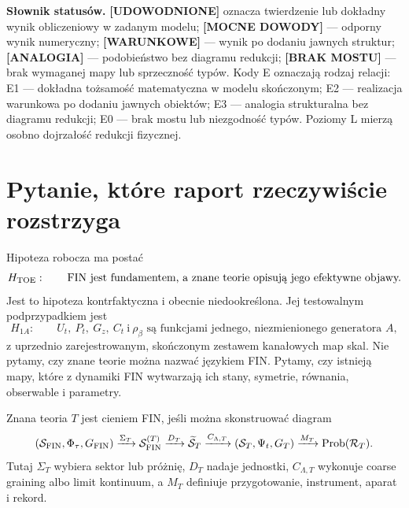 \documentclass[11pt,a4paper]{article}
\newcommand{\proven}{\textcolor{green!45!black}{\textbf{[UDOWODNIONE]}}}
\newcommand{\strong}{\textcolor{blue!70!black}{\textbf{[MOCNE DOWODY]}}}
\newcommand{\conditional}{\textcolor{black!60}{\textbf{[WARUNKOWE]}}}
\newcommand{\analogy}{\textcolor{orange!85!black}{\textbf{[ANALOGIA]}}}
\newcommand{\absent}{\textcolor{red!72!black}{\textbf{[BRAK MOSTU]}}}
\begin{document}
\begin{abstract}
Najbardziej falsyfikowalną wersją hipotezy jest węższy ansatz $H_{1A}$: wybrane kanały są funkcjami jednego zamrożonego $A$. Jeżeli niezależnie zrekonstruowane częstości, szybkości relaksacji, bieguny odpowiedzi i wagi termiczne nie mają wspólnej dopuszczalnej klasy generatora, upada $H_{1A}$, nie ogólne i niedookreślone $H_{\rm TOE}$. Najmniejsza kandydacka TOE musi rozszerzyć pojedynczy operator do operacyjnego systemu spektralnego zawierającego algebrę obserwabli, stan, sektory, jednostki, refinację, instrumenty, środowisko i rekord.
\end{abstract}

\textbf{Słownik statusów.} \proven{} oznacza twierdzenie lub dokładny wynik obliczeniowy w zadanym modelu; \strong{} --- odporny wynik numeryczny; \conditional{} --- wynik po dodaniu jawnych struktur; \analogy{} --- podobieństwo bez diagramu redukcji; \absent{} --- brak wymaganej mapy lub sprzeczność typów. Kody E oznaczają rodzaj relacji: E1 --- dokładna tożsamość matematyczna w modelu skończonym; E2 --- realizacja warunkowa po dodaniu jawnych obiektów; E3 --- analogia strukturalna bez diagramu redukcji; E0 --- brak mostu lub niezgodność typów. Poziomy L mierzą osobno dojrzałość redukcji fizycznej.

\tableofcontents
\newpage

\section{Pytanie, które raport rzeczywiście rozstrzyga}

Hipoteza robocza ma postać
\begin{equation}
 H_{\rm TOE}:\qquad \text{FIN jest fundamentem, a znane teorie opisują jego efektywne objawy.} \label{eq:htoe}
\end{equation}
Jest to hipoteza kontrfaktyczna i obecnie niedookreślona. Jej testowalnym podprzypadkiem jest
\begin{equation}
 H_{1A}:\qquad U_t,\ P_t,\ G_z,\ C_t\ \text{i}\ \rho_\beta
\text{ są funkcjami jednego, niezmienionego generatora }A,                 \label{eq:h1a}
\end{equation}
z uprzednio zarejestrowanym, skończonym zestawem kanałowych map skal. Nie pytamy, czy znane teorie można nazwać językiem FIN. Pytamy, czy istnieją mapy, które z dynamiki FIN wytwarzają ich stany, symetrie, równania, obserwable i parametry.

Znana teoria $T$ jest cieniem FIN, jeśli można skonstruować diagram
\begin{equation}
(\mathcal S_{\rm FIN},\Phi_\tau,G_{\rm FIN})
\xrightarrow{\Sigma_T}
\mathcal S_{\rm FIN}^{(T)}
\xrightarrow{D_T}
\widetilde{\mathcal S}_T
\xrightarrow{C_{\Lambda,T}}
(\mathcal S_T,\Psi_t,G_T)
\xrightarrow{M_T}
\operatorname{Prob}(\mathcal R_T).                 \label{eq:shadowdiagram}
\end{equation}
Tutaj $\Sigma_T$ wybiera sektor lub próżnię, $D_T$ nadaje jednostki, $C_{\Lambda,T}$ wykonuje coarse graining albo limit kontinuum, a $M_T$ definiuje przygotowanie, instrument, aparat i rekord.
\end{document}

